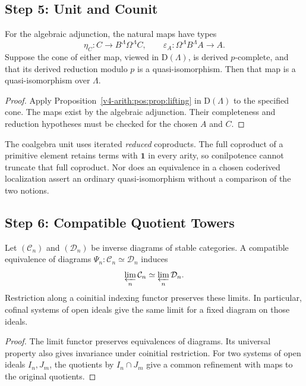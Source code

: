 \subsection{Step 5: Unit and Counit}
\label{v4-arith:pos:step-5}

\begin{theorem}
\label{v4-arith:pos:thm:unit-counit-qi}
For the algebraic adjunction, the natural maps have types
\[
 \eta_C:C\longrightarrow B^\Lambda\Omega^\Lambda C,
 \qquad
 \varepsilon_A:\Omega^\Lambda B^\Lambda A\longrightarrow A.
\]
Suppose the cone of either map, viewed in \(\mathrm D(\Lambda)\),
is derived \(p\)-complete, and that its derived reduction
modulo \(p\) is a quasi-isomorphism. Then that map is a
quasi-isomorphism over \(\Lambda\).
\end{theorem}
\begin{proof}
Apply Proposition~\ref{v4-arith:pos:prop:lifting} in
\(\mathrm D(\Lambda)\) to the specified cone.
The maps exist by the algebraic adjunction. Their completeness
and reduction hypotheses must be checked for the chosen
\(A\) and \(C\).
\end{proof}

The coalgebra unit uses iterated \emph{reduced} coproducts.
The full coproduct of a primitive element retains terms with
\(\mathbf1\) in every arity, so conilpotence cannot truncate
that full coproduct. Nor does an equivalence in a chosen
coderived localization assert an ordinary quasi-isomorphism
without a comparison of the two notions.

\subsection{Step 6: Compatible Quotient Towers}
\label{v4-arith:pos:step-6}

\begin{lemma}
\label{v4-arith:pos:lem:independence}
Let \((\mathcal C_n)\) and \((\mathcal D_n)\) be inverse
diagrams of stable categories. A compatible equivalence of
diagrams \(\Psi_n:\mathcal C_n\simeq\mathcal D_n\) induces
\[
 \varprojlim_n\mathcal C_n\simeq\varprojlim_n\mathcal D_n.
\]
Restriction along a coinitial indexing functor preserves these
limits. In particular, cofinal systems of open ideals give
the same limit for a fixed diagram on those ideals.
\end{lemma}
\begin{proof}
The limit functor preserves equivalences of diagrams.
Its universal property also gives invariance under coinitial
restriction. For two systems of open ideals \(I_n,J_m\),
the quotients by \(I_n\cap J_m\) give a common refinement
with maps to the original quotients.
\end{proof}

